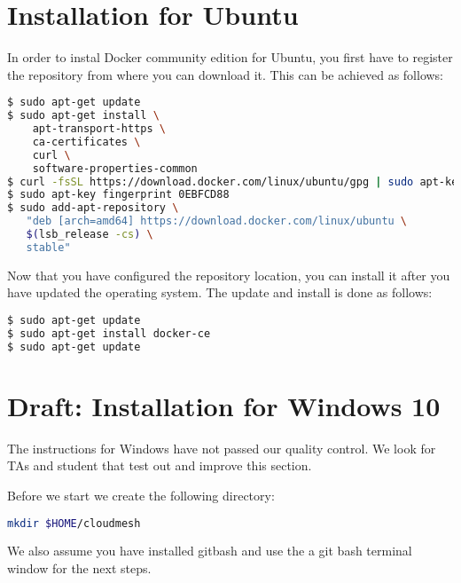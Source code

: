 \section{Installation for Ubuntu}
\label{s:docker-ubuntu}

In order to instal Docker community edition for Ubuntu, you first have
to register the repository from where you can download it. This can be
achieved as follows:

\begin{lstlisting}[language=bash]
$ sudo apt-get update
$ sudo apt-get install \
    apt-transport-https \
    ca-certificates \
    curl \
    software-properties-common
$ curl -fsSL https://download.docker.com/linux/ubuntu/gpg | sudo apt-key add -
$ sudo apt-key fingerprint 0EBFCD88
$ sudo add-apt-repository \
   "deb [arch=amd64] https://download.docker.com/linux/ubuntu \
   $(lsb_release -cs) \
   stable"
\end{lstlisting}

Now that you have configured the repository location, you can install it
after you have updated the operating system. The update and install is
done as follows:

\begin{lstlisting}[language=bash]
$ sudo apt-get update
$ sudo apt-get install docker-ce
$ sudo apt-get update
\end{lstlisting}


\section{Draft: Installation for Windows 10}
\label{s:docker-windows}

\begin{WARNING}
The instructions for Windows have not passed our quality control. We
look for TAs and student that test out and improve this section.
\end{WARNING}


Before we start we create the following directory:

\begin{lstlisting}[language=bash]
mkdir $HOME/cloudmesh
\end{lstlisting}

We also assume you have installed gitbash and use the a git bash
terminal window for the next steps.

